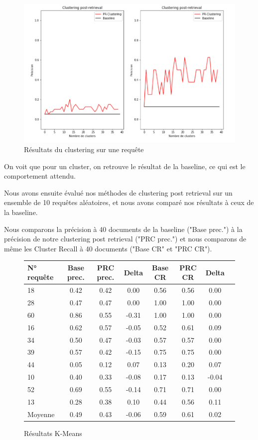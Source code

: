 \documentclass{article}
\begin{document}
\begin{figure}[H]
\includegraphics[scale=0.4]{img/qry11.png}
\caption{Résultats du clustering sur une requête}
\end{figure}

On voit que pour un cluster, on retrouve le résultat de la baseline, ce qui est le comportement attendu. 

Nous avons ensuite évalué nos méthodes de clustering post retrieval sur un ensemble de 10 requêtes aléatoires, et nous avons comparé nos résultats à ceux de la baseline.

Nous comparons la précision à 40 documents de la baseline ("Base prec.") à la précision de notre clustering post retrieval ("PRC prec.") et nous comparons de même les Cluster Recall à 40 documents ("Base CR" et "PRC CR").


\begin{figure}[H]
\begin{tabular}{l*{6}{c}r}
N° requête & Base prec. & PRC prec. & Delta  & Base CR & PRC CR & Delta\\ 
\hline
   18 &    0.42   &   0.42   &   0.00 &  0.56  & 0.56  &   0.00 \\
   28 &    0.47   &   0.47   &   0.00 &  1.00  & 1.00  &   0.00 \\
   60 &    0.86   &   0.55   &  -0.31 &  1.00  & 1.00  &   0.00 \\
   16 &    0.62   &   0.57   &  -0.05 &  0.52  & 0.61  &   0.09 \\
   34 &    0.50   &   0.47   &  -0.03 &  0.57  & 0.57  &   0.00 \\
   39 &    0.57   &   0.42   &  -0.15 &  0.75  & 0.75  &   0.00 \\
   44 &    0.05   &   0.12   &   0.07 &  0.13  & 0.20  &   0.07 \\
   10 &    0.40   &   0.33   &  -0.08 &  0.17  & 0.13  &  -0.04 \\
   52 &    0.69   &   0.55   &  -0.14 &  0.71  & 0.71  &   0.00 \\
   13 &    0.28   &   0.38   &   0.10 &  0.44  & 0.56  &   0.11 \\
\hline
Moyenne  &    0.49   &   0.43   &  -0.06 &  0.59  & 0.61  &   0.02 \\
\end{tabular}
\caption{Résultats K-Means}
\end{figure}
\end{document}
